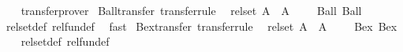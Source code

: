 \begin{isabellebody}
%
\isadelimproof
\ \ %
\endisadelimproof
%
\isatagproof
{}\isamarkupfalse%
\ transfer{\isacharunderscore}{\kern0pt}prover%
\endisatagproof
{\isafoldproof}%
%
\isadelimproof
\isanewline
%
\endisadelimproof
\isanewline
{}\isamarkupfalse%
\ Ball{\isacharunderscore}{\kern0pt}transfer\ {\isacharbrackleft}{\kern0pt}transfer{\isacharunderscore}{\kern0pt}rule{\isacharbrackright}{\kern0pt}{\isacharcolon}{\kern0pt}\isanewline
\ \ {\isachardoublequoteopen}{\isacharparenleft}{\kern0pt}rel{\isacharunderscore}{\kern0pt}set\ A\ {\isacharequal}{\kern0pt}{\isacharequal}{\kern0pt}{\isacharequal}{\kern0pt}{\isachargreater}{\kern0pt}\ {\isacharparenleft}{\kern0pt}A\ {\isacharequal}{\kern0pt}{\isacharequal}{\kern0pt}{\isacharequal}{\kern0pt}{\isachargreater}{\kern0pt}\ {\isacharparenleft}{\kern0pt}{\isacharequal}{\kern0pt}{\isacharparenright}{\kern0pt}{\isacharparenright}{\kern0pt}\ {\isacharequal}{\kern0pt}{\isacharequal}{\kern0pt}{\isacharequal}{\kern0pt}{\isachargreater}{\kern0pt}\ {\isacharparenleft}{\kern0pt}{\isacharequal}{\kern0pt}{\isacharparenright}{\kern0pt}{\isacharparenright}{\kern0pt}\ Ball\ Ball{\isachardoublequoteclose}\isanewline
%
\isadelimproof
\ \ %
\endisadelimproof
%
\isatagproof
{}\isamarkupfalse%
\ rel{\isacharunderscore}{\kern0pt}set{\isacharunderscore}{\kern0pt}def\ rel{\isacharunderscore}{\kern0pt}fun{\isacharunderscore}{\kern0pt}def\ \isamarkupfalse%
\ fast%
\endisatagproof
{\isafoldproof}%
%
\isadelimproof
\isanewline
%
\endisadelimproof
\isanewline
{}\isamarkupfalse%
\ Bex{\isacharunderscore}{\kern0pt}transfer\ {\isacharbrackleft}{\kern0pt}transfer{\isacharunderscore}{\kern0pt}rule{\isacharbrackright}{\kern0pt}{\isacharcolon}{\kern0pt}\isanewline
\ \ {\isachardoublequoteopen}{\isacharparenleft}{\kern0pt}rel{\isacharunderscore}{\kern0pt}set\ A\ {\isacharequal}{\kern0pt}{\isacharequal}{\kern0pt}{\isacharequal}{\kern0pt}{\isachargreater}{\kern0pt}\ {\isacharparenleft}{\kern0pt}A\ {\isacharequal}{\kern0pt}{\isacharequal}{\kern0pt}{\isacharequal}{\kern0pt}{\isachargreater}{\kern0pt}\ {\isacharparenleft}{\kern0pt}{\isacharequal}{\kern0pt}{\isacharparenright}{\kern0pt}{\isacharparenright}{\kern0pt}\ {\isacharequal}{\kern0pt}{\isacharequal}{\kern0pt}{\isacharequal}{\kern0pt}{\isachargreater}{\kern0pt}\ {\isacharparenleft}{\kern0pt}{\isacharequal}{\kern0pt}{\isacharparenright}{\kern0pt}{\isacharparenright}{\kern0pt}\ Bex\ Bex{\isachardoublequoteclose}\isanewline
%
\isadelimproof
\ \ %
\endisadelimproof
%
\isatagproof
{}\isamarkupfalse%
\ rel{\isacharunderscore}{\kern0pt}set{\isacharunderscore}{\kern0pt}def\ rel{\isacharunderscore}{\kern0pt}fun{\isacharunderscore}{\kern0pt}def\ \isamarkupfalse%

\end{isabellebody}
